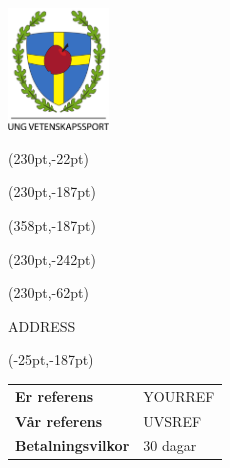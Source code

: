 \documentclass[a4paper,11pt]{article}
\begin{document}
\pagestyle{fancy}
\fancyhf{}
\renewcommand{\headrulewidth}{0pt}
\renewcommand{\footrulewidth}{0pt}

\setlength{\fboxsep}{1.5em}
\setlength{\parindent}{0pt}

\includegraphics[width=0.2\textwidth]{logo.png}



\fancyput*(230pt,-22pt){}

\fancyput*(230pt,-187pt){}

\fancyput*(358pt,-187pt){}

\fancyput*(230pt,-242pt){}

\fancyput*(230pt,-62pt){
  \begin{minipage}[t]{215pt}
        ADDRESS
    \end{minipage}}

\fancyput*(-25pt,-187pt){
    \begin{minipage}{85pt}
      \begin{tabular}{ll}
        \textbf{Er referens} & YOURREF \\
        \textbf{Vår referens} & UVSREF \\
        \textbf{Betalningsvilkor} & 30 dagar
      \end{tabular}
    \end{minipage}}
\end{document}
